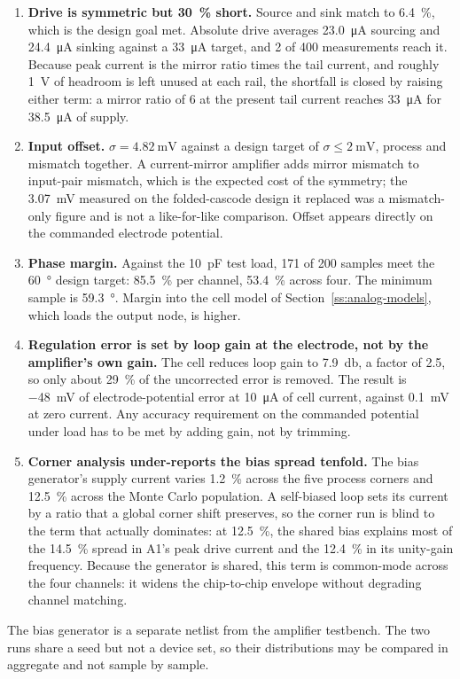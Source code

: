 \begin{enumerate}
\item \textbf{Drive is symmetric but \SI{30}{\percent} short.} Source and sink match to
\SI{6.4}{\percent}, which is the design goal met. Absolute drive averages
\SI{23.0}{\micro\ampere} sourcing and \SI{24.4}{\micro\ampere} sinking against a
\SI{33}{\micro\ampere} target, and 2 of 400 measurements reach it. Because peak current
is the mirror ratio times the tail current, and roughly \SI{1}{\volt} of headroom is
left unused at each rail, the shortfall is closed by raising either term: a mirror ratio
of 6 at the present tail current reaches \SI{33}{\micro\ampere} for
\SI{38.5}{\micro\ampere} of supply.

\item \textbf{Input offset.} \(\sigma = \SI{4.82}{\milli\volt}\) against a design
target of \(\sigma \leq \SI{2}{\milli\volt}\), process and mismatch together. A current-mirror amplifier adds mirror mismatch to input-pair
mismatch, which is the expected cost of the symmetry; the \SI{3.07}{\milli\volt} measured
on the folded-cascode design it replaced was a mismatch-only figure and is not a like-for-like
comparison. Offset appears directly on the commanded electrode potential.

\item \textbf{Phase margin.} Against the \SI{10}{\pico\farad} test load, 171 of 200
samples meet the \SI{60}{\degree} design target: \SI{85.5}{\percent} per channel,
\SI{53.4}{\percent} across four. The minimum sample is \SI{59.3}{\degree}. Margin into
the cell model of Section~\ref{ss:analog-models}, which loads the output node, is
higher.

\item \textbf{Regulation error is set by loop gain at the electrode, not by the
amplifier's own gain.} The cell reduces loop gain to \SI{7.9}{\decibel}, a factor of
2.5, so only about \SI{29}{\percent} of the uncorrected error is removed. The result is
\SI{-48}{\milli\volt} of electrode-potential error at \SI{10}{\micro\ampere} of cell
current, against \SI{0.1}{\milli\volt} at zero current. Any accuracy requirement on the
commanded potential under load has to be met by adding gain, not by trimming.

\item \textbf{Corner analysis under-reports the bias spread tenfold.} The bias generator's
supply current varies \SI{1.2}{\percent} across the five process corners and
\SI{12.5}{\percent} across the Monte Carlo population. A self-biased loop sets its current
by a ratio that a global corner shift preserves, so the corner run is blind to the term
that actually dominates: at \SI{12.5}{\percent}, the shared bias explains most of the
\SI{14.5}{\percent} spread in A1's peak drive current and the \SI{12.4}{\percent} in its
unity-gain frequency. Because the generator is shared, this term is common-mode across the
four channels: it widens the chip-to-chip envelope without degrading channel matching.
\end{enumerate}

The bias generator is a separate netlist from the amplifier testbench. The two runs
share a seed but not a device set, so their distributions may be compared in aggregate
and not sample by sample.
